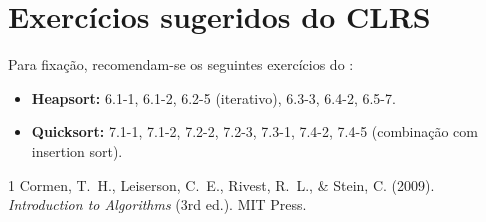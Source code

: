 \documentclass[9pt,a4paper]{extarticle}
\theoremstyle{definition}
\begin{document}
\begin{center}
\end{center}

\section{Exercícios sugeridos do CLRS}

Para fixação, recomendam-se os seguintes exercícios do \citet{cormen2009}:
\begin{itemize}
  \item \textbf{Heapsort:} 6.1-1, 6.1-2, 6.2-5 (iterativo), 6.3-3, 6.4-2,
    6.5-7.
  \item \textbf{Quicksort:} 7.1-1, 7.1-2, 7.2-2, 7.2-3, 7.3-1, 7.4-2,
    7.4-5 (combinação com insertion sort).
\end{itemize}


\begin{thebibliography}{1}
Cormen, T.~H., Leiserson, C.~E., Rivest, R.~L., \& Stein, C. (2009).
\newblock \emph{Introduction to Algorithms} (3rd ed.).
\newblock MIT Press.
\end{thebibliography}
\end{document}
